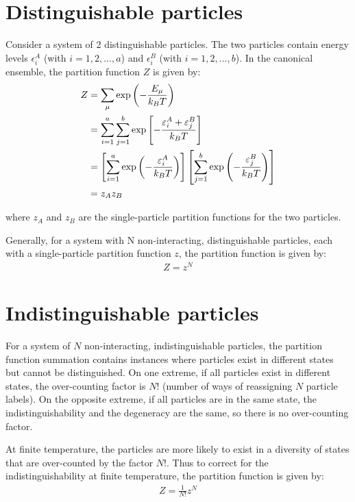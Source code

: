\documentclass[book.tex]{subfiles}
\begin{document}
\section{Distinguishable particles}

Consider a system of 2 distinguishable particles. The two particles contain energy levels $\epsilon_i^A$ (with $i=1,2,...,a$) and $\epsilon_i^B$ (with $i=1,2,...,b$). In the canonical ensemble, the partition function $Z$ is given by:
\begin{align}
Z &= \sum_\mu \exp \left(-\frac{E_\mu}{k_BT}\right)\notag\\ 
&= \sum_{i=1}^a \sum_{j=1}^b \exp \left[-\frac{\varepsilon_i^A+\varepsilon_j^B}{k_BT}\right] \notag\\
 &= \left[\sum_{i=1}^a \exp \left(-\frac{\varepsilon_i^A}{k_BT}\right)\right] \left[\sum_{j=1}^b \exp \left(-\frac{\varepsilon_j^B}{k_BT}\right)\right] \notag\\
 &= z_Az_B \notag
\end{align}

\noindent where $z_A$ and $z_B$ are the single-particle partition functions for the two particles.

Generally, for a system with N non-interacting, distinguishable particles, each with a single-particle partition function $z$, the partition function is given by:
\begin{align} \label{part_dist}
Z = z^N
\end{align}

\section{Indistinguishable particles}
For a system of $N$ non-interacting, indistinguishable particles, the partition function summation contains instances where particles exist in different states but cannot be distinguished. On one extreme, if all particles exist in different states, the over-counting factor is $N!$ (number of ways of reassigning $N$ particle labels). On the opposite extreme, if all particles are in the same state,
the indistinguishability and the degeneracy are the same, so there is no over-counting factor.

At finite temperature, the particles are more likely to exist in a
diversity of states that are over-counted by the factor $N!$. Thus to correct for the indistinguishability at finite temperature, the partition function is given by:
\begin{align} \label{part_indist}
Z = \frac{1}{N!} z^N
\end{align}
\end{document}
